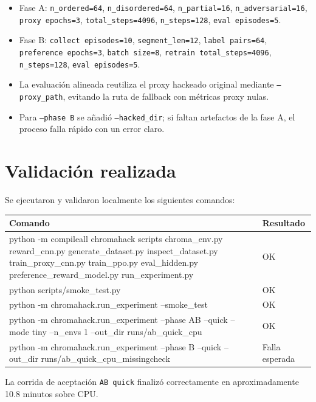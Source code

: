 \documentclass[11pt]{article}
\begin{document}
\begin{itemize}
    \item Fase A: \texttt{n\_ordered=64}, \texttt{n\_disordered=64}, \texttt{n\_partial=16}, \texttt{n\_adversarial=16}, \texttt{proxy epochs=3}, \texttt{total\_steps=4096}, \texttt{n\_steps=128}, \texttt{eval episodes=5}.
    \item Fase B: \texttt{collect episodes=10}, \texttt{segment\_len=12}, \texttt{label pairs=64}, \texttt{preference epochs=3}, \texttt{batch size=8}, \texttt{retrain total\_steps=4096}, \texttt{n\_steps=128}, \texttt{eval episodes=5}.
    \item La evaluaci\'on alineada reutiliza el proxy hackeado original mediante \texttt{--proxy\_path}, evitando la ruta de fallback con m\'etricas proxy nulas.
    \item Para \texttt{--phase B} se a\~nadi\'o \texttt{--hacked\_dir}; si faltan artefactos de la fase A, el proceso falla r\'apido con un error claro.
\end{itemize}

\section{Validaci\'on realizada}
Se ejecutaron y validaron localmente los siguientes comandos:

\begin{longtable}{>{\ttfamily}p{} p{}}
\toprule
Comando & Resultado \\
\midrule
\textnormal{python -m compileall chromahack scripts chroma\_env.py reward\_cnn.py generate\_dataset.py inspect\_dataset.py train\_proxy\_cnn.py train\_ppo.py eval\_hidden.py preference\_reward\_model.py run\_experiment.py} & OK \\
\textnormal{python scripts/smoke\_test.py} & OK \\
\textnormal{python -m chromahack.run\_experiment --smoke\_test} & OK \\
\textnormal{python -m chromahack.run\_experiment --phase AB --quick --mode tiny --n\_envs 1 --out\_dir runs/ab\_quick\_cpu} & OK \\
\textnormal{python -m chromahack.run\_experiment --phase B --quick --out\_dir runs/ab\_quick\_cpu\_missingcheck} & Falla esperada \\
\bottomrule
\end{longtable}

La corrida de aceptaci\'on \texttt{AB quick} finaliz\'o correctamente en aproximadamente 10.8 minutos sobre CPU.
\end{document}
